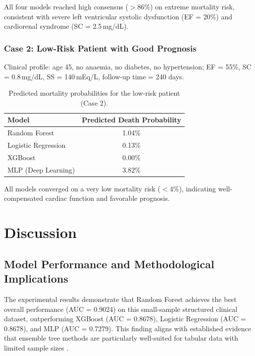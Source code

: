 \documentclass[12pt,a4paper]{article}
\begin{document}
All four models reached high consensus ($>86\%$) on extreme mortality risk, consistent with severe left ventricular systolic dysfunction (EF = 20\%) and cardiorenal syndrome (SC = 2.5\,mg/dL).

\subsubsection{Case 2: Low-Risk Patient with Good Prognosis}

Clinical profile: age 45, no anaemia, no diabetes, no hypertension; EF = 55\%, SC = 0.8\,mg/dL, SS = 140\,mEq/L, follow-up time = 240 days.

\begin{table}[H]
\centering
\caption{Predicted mortality probabilities for the low-risk patient (Case 2).}
\label{tab:case2}
\begin{tabular}{lc}
\toprule
\textbf{Model} & \textbf{Predicted Death Probability} \\
\midrule
Random Forest       & 1.04\% \\
Logistic Regression & 0.13\% \\
XGBoost             & 0.00\% \\
MLP (Deep Learning) & 3.82\% \\
\bottomrule
\end{tabular}
\end{table}

All models converged on a very low mortality risk ($<4\%$), indicating well-compensated cardiac function and favorable prognosis.

\section{Discussion}
\label{sec:discussion}

\subsection{Model Performance and Methodological Implications}

The experimental results demonstrate that Random Forest achieves the best overall performance (AUC = 0.9024) on this small-sample structured clinical dataset, outperforming XGBoost (AUC = 0.8678), Logistic Regression (AUC = 0.8678), and MLP (AUC = 0.7279). This finding aligns with established evidence that ensemble tree methods are particularly well-suited for tabular data with limited sample sizes \citep{ali2023ml, uddin2019comparing}.
\end{document}
